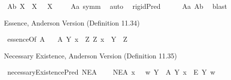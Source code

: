 \begin{isabellebody}
\isanewline
{}\isamarkupfalse%
\ A{}b{\isacharcolon}\ {\isachardoublequoteopen}{\isasymlfloor}\isactrlbold {\isasymforall}X{\isachardot}\ \isactrlbold {\isasymnot}{\isacharparenleft}{\isasymP}\ X{\isacharparenright}\ \isactrlbold {\isasymrightarrow}\ \isactrlbold {\isasymbox}\isactrlbold {\isasymnot}{\isacharparenleft}{\isasymP}\ X{\isacharparenright}{\isasymrfloor}{\isachardoublequoteclose}\ \isanewline
%
\ \ %
%
\isamarkupfalse%
\ A{}a\ symm\ \isamarkupfalse%
\ auto\ %
%
%
\isanewline
%
\isamarkupfalse%
\ {\isachardoublequoteopen}{\isasymlfloor}rigidPred\ {\isasymP}{\isasymrfloor}{\isachardoublequoteclose}\ \isanewline
%
\ \ %
%
\isamarkupfalse%
\ A{}a\ A{}b\ \isamarkupfalse%
\ blast\ %
%
%
%
%
\begin{isamarkuptext}%
Essence, Anderson Version (Definition 11.34)%
\end{isamarkuptext}\isamarkuptrue%
\isamarkupfalse%
\ essenceOf{\isacharcolon}{\isacharcolon}{\isachardoublequoteopen}{\isasymup}{\isasymlangle}{\isasymup}{\isasymlangle}{\isasymzero}{\isasymrangle}{\isacharcomma}{\isasymzero}{\isasymrangle}{\isachardoublequoteclose}\ {\isacharparenleft}{\isachardoublequoteopen}{\isasymE}\isactrlsup A{\isachardoublequoteclose}{\isacharparenright}\ \isanewline
\ \ {\isachardoublequoteopen}{\isasymE}\isactrlsup A\ Y\ x\ {\isasymequiv}\ {\isacharparenleft}\isactrlbold {\isasymforall}Z{\isachardot}\ \isactrlbold {\isasymbox}{\isacharparenleft}Z\ x{\isacharparenright}\ \isactrlbold {\isasymleftrightarrow}\ Y\ {\isasymRrightarrow}\ Z{\isacharparenright}{\isachardoublequoteclose}%
\begin{isamarkuptext}%
Necessary Existence, Anderson Version (Definition 11.35)%
\end{isamarkuptext}\isamarkuptrue%
\isamarkupfalse%
\ necessaryExistencePred{\isacharcolon}{\isacharcolon}{\isachardoublequoteopen}{\isasymup}{\isasymlangle}{\isasymzero}{\isasymrangle}{\isachardoublequoteclose}\ {\isacharparenleft}{\isachardoublequoteopen}NE\isactrlsup A{\isachardoublequoteclose}{\isacharparenright}\ \isanewline
\ \ \ {\isachardoublequoteopen}NE\isactrlsup A\ x\ \ {\isasymequiv}\ {\isacharparenleft}{\isasymlambda}w{\isachardot}\ {\isacharparenleft}\isactrlbold {\isasymforall}Y{\isachardot}\ \ {\isasymE}\isactrlsup A\ Y\ x\ \isactrlbold {\isasymrightarrow}\ \isactrlbold {\isasymbox}\isactrlbold {\isasymexists}\isactrlsup E\ Y{\isacharparenright}\ w{\isacharparenright}{\isachardoublequoteclose}%

\end{isabellebody}
